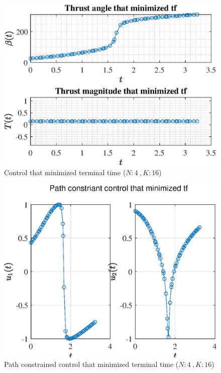 \documentclass[]{article}
\begin{document}
	\begin{figure}
		\centering
		\includegraphics[scale=0.75]{control_N4_K16_C3_tf.eps}
		\caption{Control that minimized terminal time (\(N:4\ , K:16\))}
		\label{fig:control_N4_K16_C3_tf}
	\end{figure}
	\begin{figure}
		\centering
		\includegraphics[scale=0.75]{path_N4_K16_C3_tf.eps}
		\caption{Path constrained control that minimized terminal time (\(N:4\ , K:16\))}
		\label{fig:path_N4_K16_C3_tf}
	\end{figure}
\end{document}
